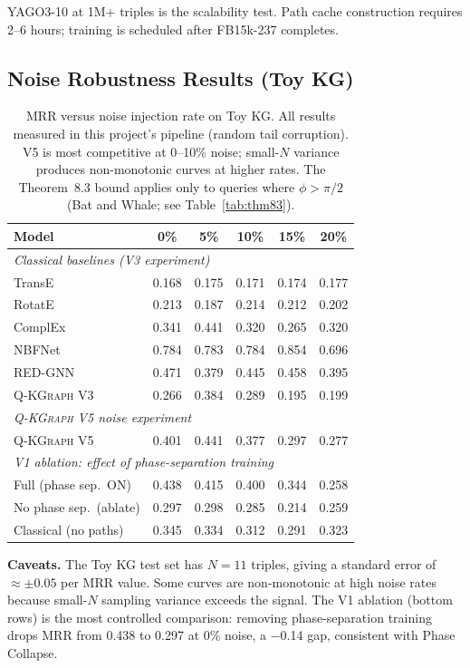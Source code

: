 \documentclass[runningheads]{llncs}
\newcommand{\QR}{\textsc{Q-KGraph}}
\begin{document}
YAGO3-10 at 1M+ triples is the scalability test.  Path cache construction
requires 2--6 hours; training is scheduled after FB15k-237 completes.

\subsection{Noise Robustness Results (Toy KG)}

\begin{table}[t]
\caption{MRR versus noise injection rate on Toy KG.  All results measured in
  this project's pipeline (random tail corruption).  V5 is most competitive at
  0--10\% noise; small-$N$ variance produces non-monotonic curves at higher
  rates.  The Theorem~8.3 bound applies only to queries where $\phi>\pi/2$
  (Bat and Whale; see Table~\ref{tab:thm83}).}
\label{tab:noise}
\centering
\small
\begin{tabular}{lccccc}
\toprule
Model             & 0\% & 5\% & 10\% & 15\% & 20\% \\
\midrule
\multicolumn{6}{l}{\textit{Classical baselines (V3 experiment)}} \\
TransE            & 0.168 & 0.175 & 0.171 & 0.174 & 0.177 \\
RotatE            & 0.213 & 0.187 & 0.214 & 0.212 & 0.202 \\
ComplEx           & 0.341 & 0.441 & 0.320 & 0.265 & 0.320 \\
NBFNet            & 0.784 & 0.783 & 0.784 & 0.854 & 0.696 \\
RED-GNN           & 0.471 & 0.379 & 0.445 & 0.458 & 0.395 \\
\QR{} V3          & 0.266 & 0.384 & 0.289 & 0.195 & 0.199 \\
\midrule
\multicolumn{6}{l}{\textit{\QR{} V5 noise experiment}} \\
\QR{} V5          & 0.401 & 0.441 & 0.377 & 0.297 & 0.277 \\
\midrule
\multicolumn{6}{l}{\textit{V1 ablation: effect of phase-separation training}} \\
Full (phase sep.\ ON)  & 0.438 & 0.415 & 0.400 & 0.344 & 0.258 \\
No phase sep.\ (ablate)& 0.297 & 0.298 & 0.285 & 0.214 & 0.259 \\
Classical (no paths)   & 0.345 & 0.334 & 0.312 & 0.291 & 0.323 \\
\bottomrule
\end{tabular}
\end{table}

\textbf{Caveats.}  The Toy KG test set has $N=11$ triples, giving a standard
error of $\approx\pm0.05$ per MRR value.  Some curves are non-monotonic at
high noise rates because small-$N$ sampling variance exceeds the signal.
The V1 ablation (bottom rows) is the most controlled comparison: removing
phase-separation training drops MRR from 0.438 to 0.297 at 0\% noise, a
−0.14 gap, consistent with Phase Collapse.
\end{document}
